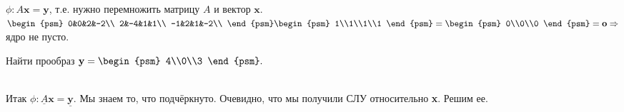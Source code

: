 $\phi: A\textbf{x}=\textbf{y}$, т.е. нужно перемножить матрицу $A$ и вектор $\textbf{x}$.\\
$
\begin{psm}
0&0&2&-2\\
2&-4&1&1\\
-1&2&1&-2\\
\end{psm}
\begin{psm}
1\\1\\1\\1
\end{psm}
=
\begin{psm}
0\\0\\0
\end{psm}
=\textbf{o}
\Rightarrow$ ядро не пусто.
\begin{prim}
Найти прообраз $\textbf{y}=\begin{psm}
	4\\0\\3
\end{psm}.$
\end{prim}\\

Итак $\phi: \underline{A}\textbf{x}=\underline{\textbf{y}}$. Мы знаем то, что подчёркнуто. Очевидно, что мы получили СЛУ относительно \textbf{x}. Решим ее.